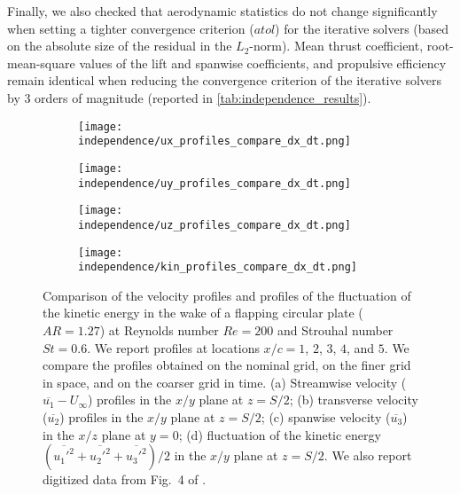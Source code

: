 Finally, we also checked that aerodynamic statistics do not change significantly when setting a tighter convergence criterion ($atol$) for the iterative solvers (based on the absolute size of the residual in the $L_2$-norm).
Mean thrust coefficient, root-mean-square values of the lift and spanwise coefficients, and propulsive efficiency remain identical when reducing the convergence criterion of the iterative solvers by 3 orders of magnitude (reported in \cref{tab:independence_results}).

\begin{figure}[!h]
  \centering
  \begin{subfigure}[c]{0.48\textwidth}
    \centering
    \texttt{[image: independence/ux\_profiles\_compare\_dx\_dt.png]}
    \caption{}
    \label{fig:independence_profiles:streamwise}
  \end{subfigure}
  \begin{subfigure}[c]{0.48\textwidth}
    \centering
    \texttt{[image: independence/uy\_profiles\_compare\_dx\_dt.png]}
    \caption{}
    \label{fig:independence_profiles:transverse}
  \end{subfigure}
  \begin{subfigure}[c]{0.48\textwidth}
    \centering
    \texttt{[image: independence/uz\_profiles\_compare\_dx\_dt.png]}
    \caption{}
    \label{fig:independence_profiles:spanwise}
  \end{subfigure}
  \begin{subfigure}[c]{0.48\textwidth}
    \centering
    \texttt{[image: independence/kin\_profiles\_compare\_dx\_dt.png]}
    \caption{}
    \label{fig:independence_profiles:kinetic}
  \end{subfigure}
  \caption{Comparison of the velocity profiles and profiles of the fluctuation of the kinetic energy in the wake of a flapping circular plate ($AR = 1.27$) at Reynolds number $Re = 200$ and Strouhal number $St = 0.6$. We report profiles at locations $x / c = 1$, $2$, $3$, $4$, and $5$. We compare the profiles obtained on the nominal grid, on the finer grid in space, and on the coarser grid in time. (a) Streamwise velocity ($\overline{u_1} - U_\infty$) profiles in the $x/y$ plane at $z = S / 2$; (b) transverse velocity ($\overline{u_2}$) profiles in the $x/y$ plane at $z = S / 2$; (c) spanwise velocity ($\overline{u_3}$) in the $x/z$ plane at $y = 0$; (d) fluctuation of the kinetic energy $( \overline{{u_1'}^2} + \overline{{u_2'}^2} + \overline{{u_3'}^2} ) / 2$ in the $x/y$ plane at $z = S / 2$. We also report digitized data from Fig.~4 of \citet{li_dong_2016}.}
  \label{fig:independence_profiles}
\end{figure}

